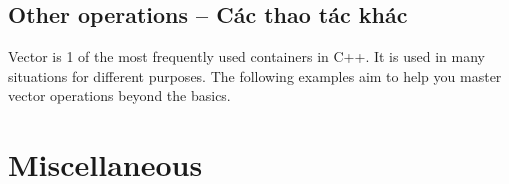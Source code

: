 \documentclass{article}
\begin{document}

\subsection{Other operations -- Các thao tác khác}
Vector is 1 of the most frequently used containers in C++. It is used in many situations for different purposes. The following examples aim to help you master vector operations beyond the basics.


\section{Miscellaneous}


\printbibliography[heading=bibintoc]
	
\end{document}
